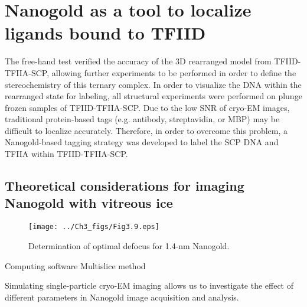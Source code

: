 \section{Nanogold as a tool to localize ligands bound to TFIID}

The free-hand test verified the accuracy of the 3D rearranged model from TFIID-TFIIA-SCP, allowing further experiments to be performed in order to define the stereochemistry of this ternary complex. In order to visualize the DNA within the rearranged state for labeling, all structural experiments were performed on plunge frozen samples of TFIID-TFIIA-SCP. Due to the low SNR of cryo-EM images, traditional protein-based tags (e.g. antibody, streptavidin, or MBP) may be difficult to localize accurately. Therefore, in order to overcome this problem, a Nanogold-based tagging strategy was developed to label the SCP DNA and TFIIA within TFIID-TFIIA-SCP.
 
\subsection{Theoretical considerations for imaging Nanogold with vitreous ice}

\begin{figure}
\centering
\texttt{[image: ../Ch3\_figs/Fig3.9.eps]}
\caption[Determination of optimal defocus for 1.4-nm Nanogold]{Determination of optimal defocus for 1.4-nm Nanogold.}
\label{fig:Gold}
\end{figure} 

Computing software \cite{Kirkland}
Multislice method \cite{Goodman}

Simulating single-particle cryo-EM imaging allows us to investigate the effect of different parameters in Nanogold image acquisition and analysis.

